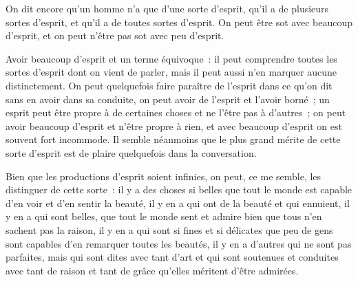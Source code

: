 \documentclass[french,twoside]{book} %
\begin{document}
On dit encore qu’un homme n’a que d’une sorte d’esprit, qu’il a de plusieurs sortes d’esprit, et qu’il a de toutes sortes d’esprit. On peut être sot avec beaucoup d’esprit, et on peut n’être pas sot avec peu d’esprit.\par
Avoir beaucoup d’esprit et un terme équivoque : il peut comprendre toutes les sortes d’esprit dont on vient de parler, mais il peut aussi n’en marquer aucune distinctement. On peut quelquefois faire paraître de l’esprit dans ce qu’on dit sans en avoir dans sa conduite, on peut avoir de l’esprit et l’avoir borné ; un esprit peut être propre à de certaines choses et ne l’être pas à d’autres ; on peut avoir beaucoup d’esprit et n’être propre à rien, et avec beaucoup d’esprit on est souvent fort incommode. Il semble néanmoins que le plus grand mérite de cette sorte d’esprit est de plaire quelquefois dans la conversation.\par
Bien que les productions d’esprit soient infinies, on peut, ce me semble, les distinguer de cette sorte : il y a des choses si belles que tout le monde est capable d’en voir et d’en sentir la beauté, il y en a qui ont de la beauté et qui ennuient, il y en a qui sont belles, que tout le monde sent et admire bien que tous n’en sachent pas la raison, il y en a qui sont si fines et si délicates que peu de gens sont capables d’en remarquer toutes les beautés, il y en a d’autres qui ne sont pas parfaites, mais qui sont dites avec tant d’art et qui sont soutenues et conduites avec tant de raison et tant de grâce qu’elles méritent d’être admirées.
\end{document}
